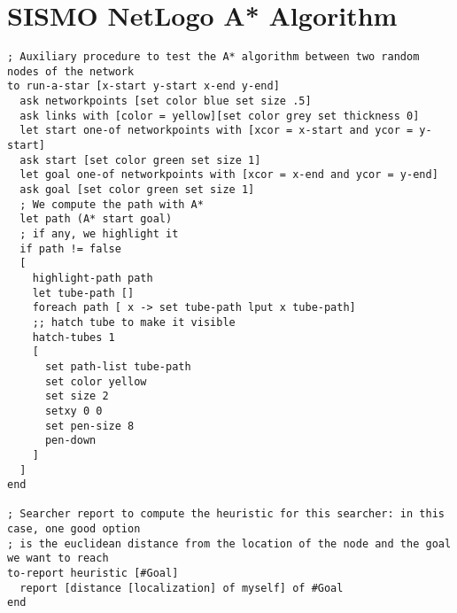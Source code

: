 \section{SISMO NetLogo A* Algorithm}
\begin{lstlisting}
; Auxiliary procedure to test the A* algorithm between two random nodes of the network
to run-a-star [x-start y-start x-end y-end]
  ask networkpoints [set color blue set size .5]
  ask links with [color = yellow][set color grey set thickness 0]
  let start one-of networkpoints with [xcor = x-start and ycor = y-start]
  ask start [set color green set size 1]
  let goal one-of networkpoints with [xcor = x-end and ycor = y-end]
  ask goal [set color green set size 1]
  ; We compute the path with A*
  let path (A* start goal)
  ; if any, we highlight it
  if path != false
  [
    highlight-path path
    let tube-path []
    foreach path [ x -> set tube-path lput x tube-path]
    ;; hatch tube to make it visible
    hatch-tubes 1
    [
      set path-list tube-path
      set color yellow
      set size 2
      setxy 0 0
      set pen-size 8
      pen-down
    ]
  ]  
end

; Searcher report to compute the heuristic for this searcher: in this case, one good option
; is the euclidean distance from the location of the node and the goal we want to reach
to-report heuristic [#Goal]
  report [distance [localization] of myself] of #Goal
end


\end{lstlisting}
